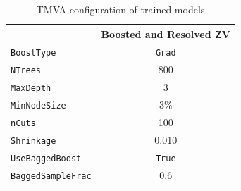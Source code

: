 \begin{table}[!ht]
  \centering
  \caption{TMVA configuration of trained models}
  \begin{tabular}{lc}%
    \toprule
                            & Boosted and Resolved ZV \\
    \midrule\relax
    \verb|BoostType|        & \verb|Grad|             \\
    \verb|NTrees|           & 800                     \\
    \verb|MaxDepth|         & 3                       \\
    \verb|MinNodeSize|      & 3\%                     \\
    \verb|nCuts|            & 100                     \\
    \verb|Shrinkage|        & 0.010                   \\
    \verb|UseBaggedBoost|   & \verb|True|             \\
    \verb|BaggedSampleFrac| & 0.6                     \\
    \bottomrule
  \end{tabular}\label{tab:training-tmva-config}
\end{table}

